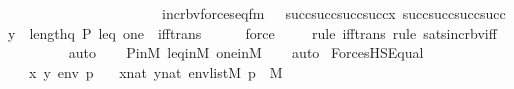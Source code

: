 \begin{isabellebody}
\ \ \ \ \ \ \ \ \ \ \ \ \ \ \ \ \ \ \ \ \ \ incr{\isacharunderscore}{\kern0pt}bv{\isacharparenleft}{\kern0pt}forces{\isacharunderscore}{\kern0pt}eq{\isacharunderscore}{\kern0pt}fm{\isacharparenleft}{\kern0pt}{}{\isacharcomma}{\kern0pt}\ {}{\isacharcomma}{\kern0pt}\ {}{\isacharcomma}{\kern0pt}\ succ{\isacharparenleft}{\kern0pt}succ{\isacharparenleft}{\kern0pt}succ{\isacharparenleft}{\kern0pt}succ{\isacharparenleft}{\kern0pt}x{\isacharparenright}{\kern0pt}{\isacharparenright}{\kern0pt}{\isacharparenright}{\kern0pt}{\isacharparenright}{\kern0pt}{\isacharcomma}{\kern0pt}\ succ{\isacharparenleft}{\kern0pt}succ{\isacharparenleft}{\kern0pt}succ{\isacharparenleft}{\kern0pt}succ{\isacharparenleft}{\kern0pt}y{\isacharparenright}{\kern0pt}{\isacharparenright}{\kern0pt}{\isacharparenright}{\kern0pt}{\isacharparenright}{\kern0pt}{\isacharparenright}{\kern0pt}{\isacharparenright}{\kern0pt}\ {\isacharbackquote}{\kern0pt}\ length{\isacharparenleft}{\kern0pt}{\isacharbrackleft}{\kern0pt}q{\isacharcomma}{\kern0pt}\ P{\isacharcomma}{\kern0pt}\ leq{\isacharcomma}{\kern0pt}\ one{\isacharbrackright}{\kern0pt}{\isacharparenright}{\kern0pt}{\isachardoublequoteclose}\ \ iff{\isacharunderscore}{\kern0pt}trans{\isacharparenright}{\kern0pt}\isanewline
\ \ \ \ \isamarkupfalse%
\ force\ \isanewline
\ \ \ \isamarkupfalse%
{\isacharparenleft}{\kern0pt}rule\ iff{\isacharunderscore}{\kern0pt}trans{\isacharcomma}{\kern0pt}\ rule\ sats{\isacharunderscore}{\kern0pt}incr{\isacharunderscore}{\kern0pt}bv{\isacharunderscore}{\kern0pt}iff{\isacharparenright}{\kern0pt}\isanewline
\ \ \ \ \ \ \ \isamarkupfalse%
\ auto{\isacharbrackleft}{\kern0pt}{}{\isacharbrackright}{\kern0pt}\isanewline
\ \ \isamarkupfalse%
\ P{\isacharunderscore}{\kern0pt}in{\isacharunderscore}{\kern0pt}M\ leq{\isacharunderscore}{\kern0pt}in{\isacharunderscore}{\kern0pt}M\ one{\isacharunderscore}{\kern0pt}in{\isacharunderscore}{\kern0pt}M\isanewline
\ \ \isamarkupfalse%
\ auto%
\endisatagproof
{\isafoldproof}%
%
\isadelimproof
\isanewline
%
\endisadelimproof
\isanewline
{}\isamarkupfalse%
\ ForcesHS{\isacharunderscore}{\kern0pt}Equal\ {\isacharcolon}{\kern0pt}\ \isanewline
\ \ \ x\ y\ env\ p\isanewline
\ \ \ {\isachardoublequoteopen}x{\isasymin}nat{\isachardoublequoteclose}\ {\isachardoublequoteopen}y{\isasymin}nat{\isachardoublequoteclose}\ {\isachardoublequoteopen}env{\isasymin}list{\isacharparenleft}{\kern0pt}M{\isacharparenright}{\kern0pt}{\isachardoublequoteclose}\ {\isachardoublequoteopen}p\ {\isasymin}\ M{\isachardoublequoteclose}\isanewline

\end{isabellebody}
